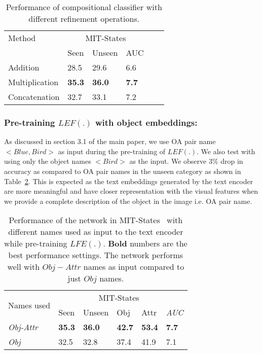 \documentclass{bmvc2k}
\newcommand{\tablelightgray}{\rowcolor[gray]{.95}}
\begin{document}
\begin{table}[h]
\centering
\begin{tabular}{l|lllll}

Method         & \multicolumn{3}{c}{MIT-States}~\cite{isola2015discovering}             \\ 
               & Seen          & Unseen        & AUC          \\ \hline
\tablelightgray
Addition       & 28.5          & 29.6          & 6.6          \\
Multiplication & \textbf{35.3} & \textbf{36.0} & \textbf{7.7} \\
\tablelightgray
Concatenation  & 32.7             & 33.1             & 7.2            \\ \hline
\end{tabular}
 \caption{Performance of compositional classifier with different refinement operations. }
\label{tab:abl:refinement}
\end{table}

\subsubsection{Pre-training $LEF(.)$ with object embeddings:} As discussed in section 3.1 of the main paper, we use OA pair name $<Blue,Bird>$ as input during the pre-training of $LEF(.)$. We also test with using only the object names $<Bird>$ as the input. We observe $3\%$ drop in accuracy as compared to OA pair names in the unseen category as shown in Table~\ref{tab:obj}. This is expected as the text embeddings generated by the text encoder are more meaningful and have closer representation with the visual features when we provide a complete description of the object in the image i.e. OA pair name.

\begin{table}[h]
\centering
\begin{tabular}{l|lllll}
\multirow{2}{*}{Names used}      & \multicolumn{5}{c}{MIT-States~\cite{isola2015discovering}}                                                                            \\
                                 & \multicolumn{1}{l|}{Seen} & \multicolumn{1}{l|}{Unseen} & \multicolumn{1}{l|}{Obj}  & \multicolumn{1}{l|}{Attr} & \textit{AUC} \\ \hline
\tablelightgray\textit{Obj-Attr} & \multicolumn{1}{l|}{\textbf{35.3}} & \multicolumn{1}{l|}{\textbf{36.0}}   & \multicolumn{1}{l|}{\textbf{42.7}} & \multicolumn{1}{l|}{\textbf{53.4}} & \textbf{7.7} \\
\textit{Obj}                     & \multicolumn{1}{l|}{32.5} & \multicolumn{1}{l|}{32.8}   & \multicolumn{1}{l|}{37.4} & \multicolumn{1}{l|}{41.9} & 7.1         
\end{tabular}
\vspace{0.1cm}
\caption{Performance of the network in MIT-States~\cite{isola2015discovering} with different names used as input to the text encoder while pre-training $LFE(.)$. \textbf{Bold} numbers are the best performance settings. The network performs well with $Obj-Attr$ names as input compared to just $Obj$ names.} 
\label{tab:obj}
\vspace{-0.4cm}
\end{table}
\end{document}
